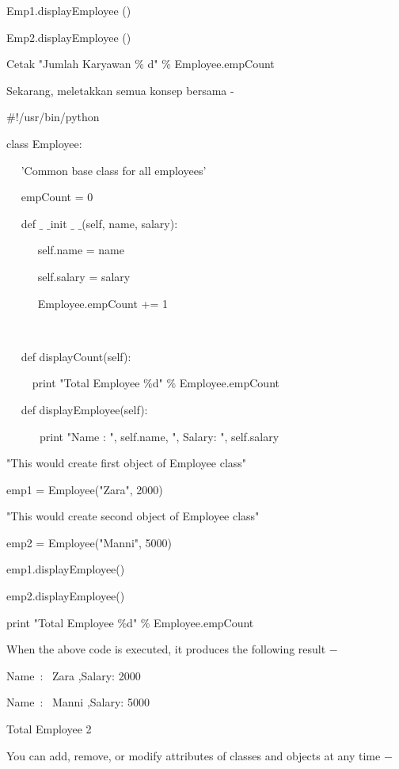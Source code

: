 \vspace{12pt}
Emp1.displayEmployee () \par
Emp2.displayEmployee () \par
Cetak "Jumlah Karyawan $  \%  $ d" $  \%  $ Employee.empCount \par
\vspace{12pt}
Sekarang, meletakkan semua konsep bersama - \par
 $  \#  $!/usr/bin/python \par
\vspace{12pt}
class Employee: \par
~~ 'Common base class for all employees' \par
~~ empCount = 0 \par
\vspace{12pt}
~~ def  $  \_  $ $  \_  $init $  \_  $ $  \_  $(self, name, salary): \par
~~~~~ self.name = name \par
~~~~~ self.salary = salary \par
~~~~~ Employee.empCount += 1 \par
~~  \par
~~ def displayCount(self): \par
~~~~ print "Total Employee  $  \%  $d"  $  \%  $ Employee.empCount \par
\vspace{12pt}
~~ def displayEmployee(self): \par
~~~~~~print "Name : ", self.name,  ", Salary: ", self.salary \par
\vspace{12pt}
"This would create first object of Employee class" \par
emp1 = Employee("Zara", 2000) \par
"This would create second object of Employee class" \par
emp2 = Employee("Manni", 5000) \par
emp1.displayEmployee() \par
emp2.displayEmployee() \par
print "Total Employee  $  \%  $d"  $  \%  $ Employee.empCount \par
When the above code is executed, it produces the following result  $ - $ \par
Name~:~ Zara ,Salary:  2000 \par
Name~:~ Manni ,Salary:  5000 \par
Total Employee 2 \par
You can add, remove, or modify attributes of classes and objects at any time  $ - $ \par
